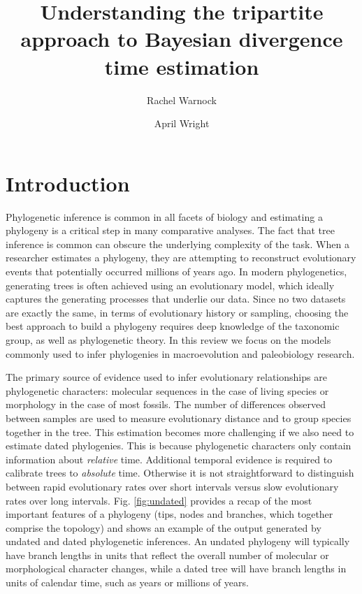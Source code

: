 \documentclass[11pt]{article}
\title{Understanding the tripartite approach to Bayesian divergence time estimation}
\author[1,2]{Rachel Warnock} \author[3]{April Wright}
\affil[1]{Department of Biosystems Science and Engineering, ETH Z\"urich, Basel, Switzerland}
\affil[2]{Swiss Institute of Bioinformatics (SIB), Switzerland}
\affil[3]{Department of Biological Sciences, Southeastern Louisiana University, Hammond, United States}
\date{}
\newcommand{\rw}[1]{{\textcolor{red}{[RW: #1]}}} %
\newcommand{\aw}[1]{{\textcolor{armygreen}{[AW: #1]}}} %
\begin{document}
\maketitle


\section{Introduction}

Phylogenetic inference is common in all facets of biology and estimating a phylogeny is a critical step in many comparative analyses. The fact that tree inference is common can obscure the underlying complexity of the task.
When a researcher estimates a phylogeny, they are attempting to reconstruct evolutionary events that potentially occurred millions of years ago.
In modern phylogenetics, generating trees is often achieved using an evolutionary model, which ideally captures the generating processes that underlie our data.
Since no two datasets are exactly the same, in terms of evolutionary history or sampling, 
choosing the best approach to build a phylogeny requires deep knowledge of the taxonomic group, as well as phylogenetic theory.
In this review we focus on the models commonly used to infer phylogenies in macroevolution and paleobiology research.

The primary source of evidence used to infer evolutionary relationships are phylogenetic characters: molecular sequences in the case of living species or morphology in the case of most fossils. 
The number of differences observed between samples are used to measure evolutionary distance and to group species together in the tree.
This estimation becomes more challenging if we also need to estimate dated phylogenies.
This is because phylogenetic characters only contain information about \textit{relative} time. 
Additional temporal evidence is required to calibrate trees to \textit{absolute} time.
Otherwise it is not straightforward to distinguish between rapid evolutionary rates over short intervals versus slow evolutionary rates over long intervals.
Fig. \ref{fig:undated} provides a recap of the most important features of a phylogeny (tips, nodes and branches, which together comprise the topology) and shows an example of the output generated by undated and dated phylogenetic inferences. 
An undated phylogeny will typically have branch lengths in units that reflect the overall number of molecular or morphological character changes, while a dated tree will have branch lengths in units of calendar time, such as years or millions of years.
\end{document}
